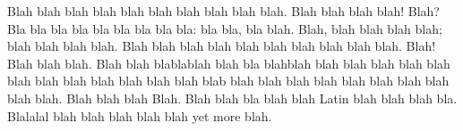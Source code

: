 \documentclass{report}
\begin{document}
\null\vfil
{\large
  \begin{center}
    Blah blah blah blah blah blah blah blah blah blah. Blah blah
    blah blah! Blah? Bla bla bla bla bla bla bla bla bla: bla bla, bla
    blah. Blah, blah blah blah blah; blah blah blah blah. Blah blah blah blah 
    blah blah blah blah blah blah. Blah! Blah blah blah. Blah blah blablablah 
    blah bla blahblah blah blah blah blah blah blah blah blah blah blah blah
    blah blab blah blah blah blah blah blah blah blah blah blah. Blah blah
    blah Blah. Blah blah bla blah blah Latin blah blah blah bla. Blalalal
    blah blah blah blah blah yet more blah.
  \end{center}}
\vfil\null
\end{document}

